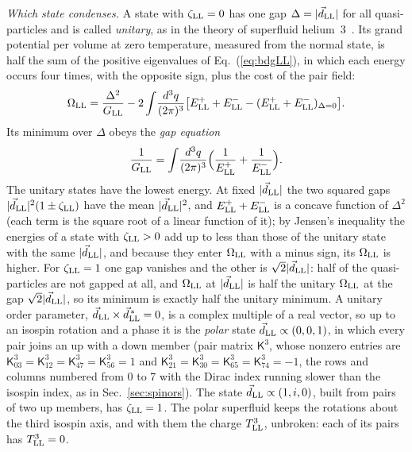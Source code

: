 \documentclass[aps,prd,twocolumn,superscriptaddress,nofootinbib,floatfix,longbibliography]{revtex4-2}
\newcommand{\LL}{{\rm LL}}
\begin{document}
\emph{Which state condenses.} A state with $\zeta_\LL=0$ has one gap $\Delta=|\vec d_\LL|$ for all quasi-particles and is
called \emph{unitary}, as in the theory of superfluid helium~3~\cite{BalianWerthamer1963,Leggett1975}. Its grand potential
per volume at zero temperature, measured from the normal state, is half the sum of the positive eigenvalues of
Eq.~(\ref{eq:bdgLL}), in which each energy occurs four times, with the opposite sign, plus the cost of the pair field:
\begin{equation}
\Omega_\LL=\frac{\Delta^2}{G_\LL}-2\int\!\frac{d^3q}{(2\pi)^3}\big[E^+_\LL+E^-_\LL-(E^+_\LL+E^-_\LL)_{\Delta=0}\big].
\label{eq:omegaLL}
\end{equation}
Its minimum over $\Delta$ obeys the \emph{gap equation}
\begin{equation}
\frac1{G_\LL}=\int\!\frac{d^3q}{(2\pi)^3}\Big(\frac1{E^+_\LL}+\frac1{E^-_\LL}\Big).
\label{eq:gapLL}
\end{equation}
The unitary states have the lowest energy. At fixed $|\vec d_\LL|$ the two squared gaps $|\vec d_\LL|^2(1\pm\zeta_\LL)$ have
the mean $|\vec d_\LL|^2$, and $E^+_\LL+E^-_\LL$ is a concave function of $\Delta^2$ (each term is the square root of a
linear function of it); by Jensen's inequality the energies of a state with $\zeta_\LL>0$ add up to less than those of the
unitary state with the same $|\vec d_\LL|$, and because they enter $\Omega_\LL$ with a minus sign, its $\Omega_\LL$ is
higher. For $\zeta_\LL=1$ one gap vanishes and the other is $\sqrt2|\vec d_\LL|$: half of the quasi-particles are not
gapped at all, and $\Omega_\LL$ at $|\vec d_\LL|$ is half the unitary $\Omega_\LL$ at the gap $\sqrt2|\vec d_\LL|$, so its
minimum is exactly half the unitary minimum. A unitary order parameter, $\vec d_\LL\times\vec d^{\,*}_\LL=0$, is a complex
multiple of a real vector, so up to an isospin rotation and a phase it is the \emph{polar} state $\vec
d_\LL\propto(0,0,1)$, in which every pair joins an up with a down member (pair matrix $\mathsf K^3$, whose nonzero entries
are $\mathsf K^3_{03}=\mathsf K^3_{12}=\mathsf K^3_{47}=\mathsf K^3_{56}=1$ and $\mathsf K^3_{21}=\mathsf K^3_{30}=\mathsf K^3_{65}=\mathsf K^3_{74}=-1$, the rows and columns numbered from 0 to 7 with the Dirac index running slower than the
isospin index, as in Sec.~\ref{sec:spinors}). The state $\vec d_\LL\propto(1,i,0)$, built from pairs of two up members,
has $\zeta_\LL=1$. The polar superfluid keeps the rotations about the third isospin axis, and with them the charge
$T^3_\LL$, unbroken: each of its pairs has $T^3_\LL=0$.
\end{document}
